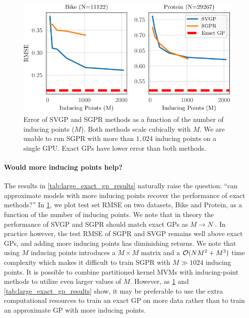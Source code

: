 \begin{figure}[!t]
  \centering
  \includegraphics[width=0.7\linewidth]{figures/inducing_points.pdf}
  \caption[Error of approximate GP methods as a function of the number of inducing points.]{
    Error of SVGP and SGPR methods as a function of the number of inducing points ($M$).
    Both methods scale cubically with $M$.
    We are unable to run SGPR with more than $1,\!024$ inducing points on a single GPU.
    Exact GPs have lower error than both methods.
  }
  \label{fig:num_inducing_points}
\end{figure}

\paragraph{Would more inducing points help?}
The results in \cref{tab:large_exact_gp_results} naturally raise the question: ``can approximate models with more inducing points recover the performance of exact methods?''
In \cref{fig:num_inducing_points}, we plot test set RMSE on two datasets, Bike and Protein, as a function of the number of inducing points.
We note that in theory the performance of SVGP and SGPR should match exact GPs as $M \rightarrow N$ \cite{titsias2009variational,hensman2013gaussian}.
In practice however, the test RMSE of SGPR and SVGP remains well above exact GPs, and adding more inducing points has diminishing returns.
We note that using $M$ inducing points introduces a $M \times M$ matrix and a $\bigo{NM^2 + M^3}$ time complexity which makes it difficult to train SGPR with $M \gg 1024$ inducing points.
It is possible to combine partitioned kernel MVMs with inducing-point methods to utilize even larger values of $M$.
However, as \cref{fig:num_inducing_points} and \cref{tab:large_exact_gp_results} show, it may be preferable to use the extra computational resources to train an exact GP on more data rather than to train an approximate GP with more inducing points.

